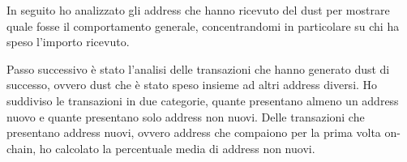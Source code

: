 In seguito ho analizzato gli address che hanno ricevuto del dust per mostrare quale fosse il comportamento generale, concentrandomi in particolare su chi ha speso l'importo ricevuto.

Passo successivo è stato l'analisi delle transazioni che hanno generato dust di successo, ovvero dust che è stato speso insieme ad altri address diversi. Ho suddiviso le transazioni in due categorie, quante presentano almeno un address nuovo e quante presentano solo address non nuovi. Delle transazioni che presentano address nuovi, ovvero address che compaiono per la prima volta on-chain, ho calcolato la percentuale media di address non nuovi.


